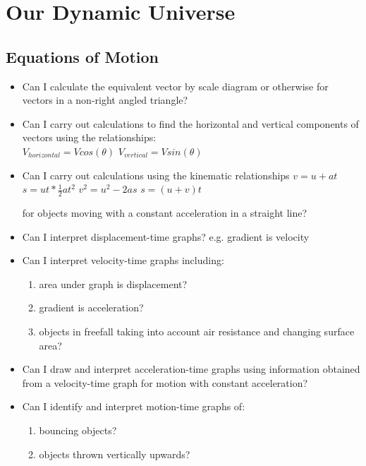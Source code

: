 \chapter{Our Dynamic Universe}

\section{Equations of Motion}
\begin{multicols}{2}
	\begin{itemize}
        \item Can I calculate the equivalent vector by scale diagram or
            otherwise for vectors in a non-right angled triangle?

         \item Can I carry out calculations to find the horizontal and
            vertical components of vectors using the relationships: \\
            $ V_{horizontal} = V cos(\theta) $ \qquad
            $ V_{vertical} = V sin(\theta) $

        \item Can I carry out calculations using the kinematic relationships
            $ v = u + at $ \qquad
            $ s = ut * \frac{1}{2}at^2 $ \qquad
            $ v^2 = u^2 - 2as $ \qquad
            $ s = (u + v) t $

            for objects moving with a constant acceleration in a straight line?

        \item Can I interpret displacement-time graphs? e.g. gradient is
           velocity

        \item Can I interpret velocity-time graphs including:
            \begin{enumerate}
               \item area under graph is displacement?
               \item gradient is acceleration?
               \item objects in freefall taking into account air resistance
                   and changing surface area?
            \end{enumerate}

        \item Can I draw and interpret acceleration-time graphs using
              information obtained from a velocity-time graph for motion with
              constant acceleration?

        \item Can I identify and interpret motion-time graphs of:
             \begin{enumerate}
                \item bouncing objects?
                \item objects thrown vertically upwards?
             \end{enumerate}

        \end{itemize}
    \end{multicols}

